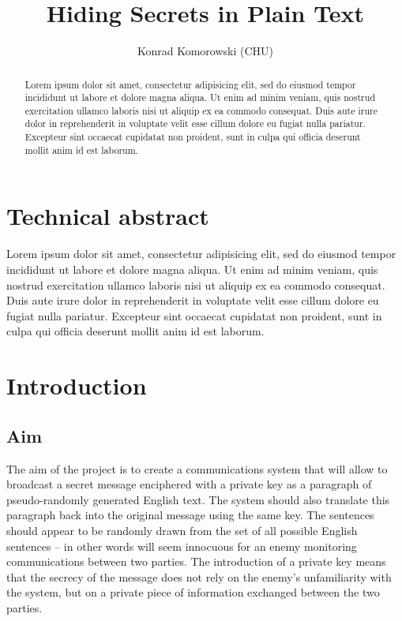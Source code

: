 \documentclass[draft]{IIBproject}
\begin{document}
\thispagestyle{empty}
\author{Konrad Komorowski (CHU)}
\title{Hiding Secrets in Plain Text}
\maketitle

\clearpage
\pagestyle{plain}
\section*{Technical abstract}

Lorem ipsum dolor sit amet, consectetur adipisicing elit, sed do eiusmod tempor incididunt ut labore et dolore magna aliqua. Ut enim ad minim veniam, quis nostrud exercitation ullamco laboris nisi ut aliquip ex ea commodo consequat. Duis aute irure dolor in reprehenderit in voluptate velit esse cillum dolore eu fugiat nulla pariatur. Excepteur sint occaecat cupidatat non proident, sunt in culpa qui officia deserunt mollit anim id est laborum.

\clearpage
\pagestyle{empty}
\begin{abstract}
Lorem ipsum dolor sit amet, consectetur adipisicing elit, sed do eiusmod tempor incididunt ut labore et dolore magna aliqua. Ut enim ad minim veniam, quis nostrud exercitation ullamco laboris nisi ut aliquip ex ea commodo consequat. Duis aute irure dolor in reprehenderit in voluptate velit esse cillum dolore eu fugiat nulla pariatur. Excepteur sint occaecat cupidatat non proident, sunt in culpa qui officia deserunt mollit anim id est laborum.
\end{abstract}
\tableofcontents

\clearpage
\pagestyle{plain}
\section{Introduction}

\subsection{Aim}

The aim of the project is to create a communications system that will allow to broadcast a secret message enciphered with a private key as a paragraph of pseudo-randomly generated English text. The system should also translate this paragraph back into the original message using the same key. The sentences should appear to be randomly drawn from the set of all possible English sentences -- in other words will seem innocuous for an enemy monitoring communications between two parties. The introduction of a private key means that the secrecy of the message does not rely on the enemy's unfamiliarity with the system, but on a private piece of information exchanged between the two parties.
\end{document}
